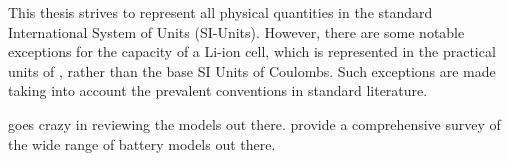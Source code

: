 
\ifpdf
    \graphicspath{{1_introduction/figures/PNG/}{1_introduction/figures/PDF/}{1_introduction/figures/}}
\else
    \graphicspath{{1_introduction/figures/EPS/}{1_introduction/figures/}}
\fi




This  thesis  strives to  represent  all  physical  quantities in  the  standard
International  System  of Units  (SI-Units).  However,  there are  some  notable
exceptions \eg{} for the capacity of a  Li-ion cell, which is represented in the
practical units  of \amphours, rather than  the base SI Units  of Coulombs. Such
exceptions are  made taking into  account the prevalent conventions  in standard
literature.


\cite{Grazioli2016a} goes crazy in reviewing the models out there.
\cite{Seaman2014} provide a comprehensive survey of the wide range of battery models out there.

